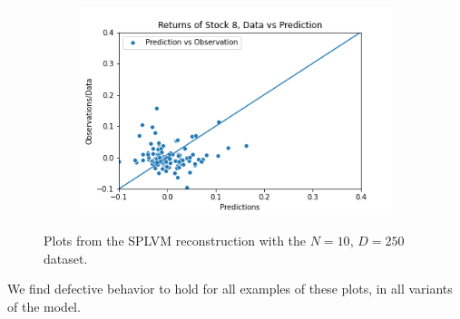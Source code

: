 \begin{figure}
\begin{subfigure}[r]{0.3\textwidth}
		\includegraphics[width=\textwidth]{img/07_4/timet_elbo/Q4_kernel2_stock8_scatter.png}
	\end{subfigure}
	\caption[Y-$\hat{Y}$ pair plots for N=10 with the T-SPLVM model]{Plots from the SPLVM reconstruction with the $N=10$, $D=250$ dataset.}
	\label{fig:tsplvm_pairs}
\end{figure} 
We find defective behavior to hold for all examples of these plots, in all variants of the model. 
